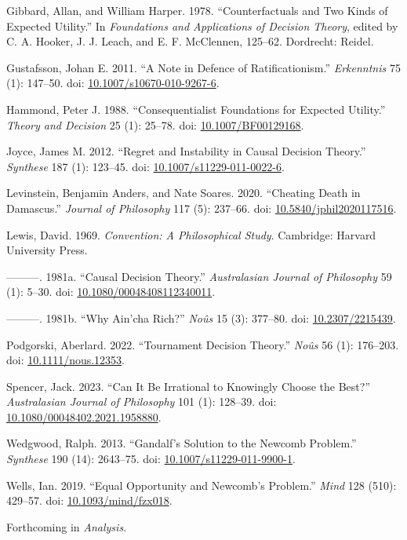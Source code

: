 \documentclass[
  11pt,
  letterpaper,
  DIV=11,
  numbers=noendperiod,
  twoside]{scrartcl}
\newlength{\cslhangindent}
\newenvironment{CSLReferences}[2] %
 {\begin{list}{}{%
  \setlength{\itemindent}{0pt}
  \setlength{\leftmargin}{0pt}
  \setlength{\parsep}{0pt}
  \ifodd #1
   \setlength{\leftmargin}{\cslhangindent}
   \setlength{\itemindent}{-1\cslhangindent}
  \fi
  \setlength{\itemsep}{#2\baselineskip}}}
 {\end{list}}
\begin{document}
\begin{CSLReferences}{1}{0}
Gibbard, Allan, and William Harper. 1978. {``Counterfactuals and Two
Kinds of Expected Utility.''} In \emph{Foundations and Applications of
Decision Theory}, edited by C. A. Hooker, J. J. Leach, and E. F.
McClennen, 125--62. Dordrecht: Reidel.

Gustafsson, Johan E. 2011. {``A Note in Defence of Ratificationism.''}
\emph{Erkenntnis} 75 (1): 147--50. doi:
\href{https://doi.org/10.1007/s10670-010-9267-6}{10.1007/s10670-010-9267-6}.

Hammond, Peter J. 1988. {``Consequentialist Foundations for Expected
Utility.''} \emph{Theory and Decision} 25 (1): 25--78. doi:
\href{https://doi.org/10.1007/BF00129168}{10.1007/BF00129168}.

Joyce, James M. 2012. {``Regret and Instability in Causal Decision
Theory.''} \emph{Synthese} 187 (1): 123--45. doi:
\href{https://doi.org/10.1007/s11229-011-0022-6}{10.1007/s11229-011-0022-6}.

Levinstein, Benjamin Anders, and Nate Soares. 2020. {``Cheating Death in
Damascus.''} \emph{Journal of Philosophy} 117 (5): 237--66. doi:
\href{https://doi.org/10.5840/jphil2020117516}{10.5840/jphil2020117516}.

Lewis, David. 1969. \emph{Convention: A Philosophical Study}. Cambridge:
Harvard University Press.

---------. 1981a. {``Causal Decision Theory.''} \emph{Australasian
Journal of Philosophy} 59 (1): 5--30. doi:
\href{https://doi.org/10.1080/00048408112340011}{10.1080/00048408112340011}.

---------. 1981b. {``Why Ain'cha Rich?''} \emph{No{û}s} 15 (3): 377--80.
doi: \href{https://doi.org/10.2307/2215439}{10.2307/2215439}.

Podgorski, Aberlard. 2022. {``Tournament Decision Theory.''}
\emph{No{û}s} 56 (1): 176--203. doi:
\href{https://doi.org/10.1111/nous.12353}{10.1111/nous.12353}.

Spencer, Jack. 2023. {``Can It Be Irrational to Knowingly Choose the
Best?''} \emph{Australasian Journal of Philosophy} 101 (1): 128--39.
doi:
\href{https://doi.org/10.1080/00048402.2021.1958880}{10.1080/00048402.2021.1958880}.

Wedgwood, Ralph. 2013. {``Gandalf's Solution to the Newcomb Problem.''}
\emph{Synthese} 190 (14): 2643--75. doi:
\href{https://doi.org/10.1007/s11229-011-9900-1}{10.1007/s11229-011-9900-1}.

Wells, Ian. 2019. {``Equal Opportunity and Newcomb's Problem.''}
\emph{Mind} 128 (510): 429--57. doi:
\href{https://doi.org/10.1093/mind/fzx018}{10.1093/mind/fzx018}.

\end{CSLReferences}



\noindent Forthcoming in \emph{Analysis}.
\end{document}
